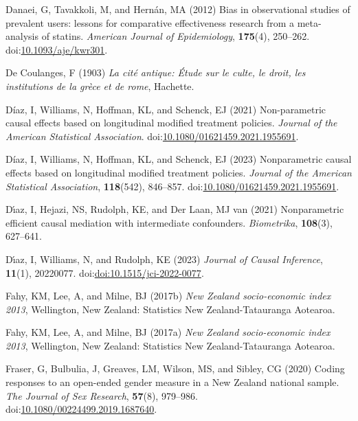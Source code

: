 \documentclass[
  single column]{article}
\newlength{\cslhangindent}
\newenvironment{CSLReferences}[2] %
 {\begin{list}{}{%
  \setlength{\itemindent}{0pt}
  \setlength{\leftmargin}{0pt}
  \setlength{\parsep}{0pt}
  \ifodd #1
   \setlength{\leftmargin}{\cslhangindent}
   \setlength{\itemindent}{-1\cslhangindent}
  \fi
  \setlength{\itemsep}{#2\baselineskip}}}
 {\end{list}}
\begin{document}
\begin{CSLReferences}{1}{0}
Danaei, G, Tavakkoli, M, and Hernán, MA (2012) Bias in observational
studies of prevalent users: lessons for comparative effectiveness
research from a meta-analysis of statins. \emph{American Journal of
Epidemiology}, \textbf{175}(4), 250--262.
doi:\href{https://doi.org/10.1093/aje/kwr301}{10.1093/aje/kwr301}.

De Coulanges, F (1903) \emph{La cité antique: Étude sur le culte, le
droit, les institutions de la grèce et de rome}, Hachette.

Díaz, I, Williams, N, Hoffman, KL, and Schenck, EJ (2021) Non-parametric
causal effects based on longitudinal modified treatment policies.
\emph{Journal of the American Statistical Association}.
doi:\href{https://doi.org/10.1080/01621459.2021.1955691}{10.1080/01621459.2021.1955691}.

Díaz, I, Williams, N, Hoffman, KL, and Schenck, EJ (2023) Nonparametric
causal effects based on longitudinal modified treatment policies.
\emph{Journal of the American Statistical Association},
\textbf{118}(542), 846--857.
doi:\href{https://doi.org/10.1080/01621459.2021.1955691}{10.1080/01621459.2021.1955691}.

Dı́az, I, Hejazi, NS, Rudolph, KE, and Der Laan, MJ van (2021)
Nonparametric efficient causal mediation with intermediate confounders.
\emph{Biometrika}, \textbf{108}(3), 627--641.

Dı́az, I, Williams, N, and Rudolph, KE (2023) \emph{Journal of Causal
Inference}, \textbf{11}(1), 20220077.
doi:\href{https://doi.org/doi:10.1515/jci-2022-0077}{doi:10.1515/jci-2022-0077}.

Fahy, KM, Lee, A, and Milne, BJ (2017b) \emph{New Zealand socio-economic
index 2013}, Wellington, New Zealand: Statistics New Zealand-Tatauranga
Aotearoa.

Fahy, KM, Lee, A, and Milne, BJ (2017a) \emph{New Zealand socio-economic
index 2013}, Wellington, New Zealand: Statistics New Zealand-Tatauranga
Aotearoa.

Fraser, G, Bulbulia, J, Greaves, LM, Wilson, MS, and Sibley, CG (2020)
Coding responses to an open-ended gender measure in a {N}ew {Z}ealand
national sample. \emph{The Journal of Sex Research}, \textbf{57}(8),
979--986.
doi:\href{https://doi.org/10.1080/00224499.2019.1687640}{10.1080/00224499.2019.1687640}.


\end{CSLReferences}
\end{document}
